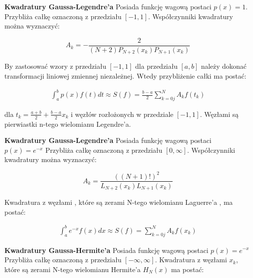 \documentclass{article}
\begin{document}
\textbf{Kwadratury Gaussa-Legendre’a}
\newline
Posiada funkcję wagową postaci $p(x) = 1.$
Przybliża całkę oznaczoną z przedziału $[-1, 1]$. Współczynniki kwadratury można
wyznaczyć:

\begin{equation}
    A_k=-\frac{2}{(N+2)P_{N+2}(x_k)P_{N+1}(x_k)}
\end{equation}

By zastosować wzory z przedziału $[-1, 1]$ dla przedziału $[a, b]$ należy dokonać
transformacji liniowej zmiennej niezależnej. Wtedy przybliżenie całki ma postać:
 
 \begin{equation}
\begin{array}{c}
\displaystyle \int_{a}^{b} p(x)f(t)dt \approx S(f) = \frac{b-a}{2} \displaystyle \sum_{k=0 j}^N A_kf(t_k)
\end{array}
\end{equation}

dla $t_k=\frac{a+b}{2}+\frac{b-a}{2}x_k$ i węzłów rozłożonych w przedziale $[-1, 1]$. Węzłami są
pierwiastki n-tego wielomianu Legendre'a.

\vspace{5}
\setlength{\parindent}{0pt}
\textbf{Kwadratury Gaussa-Legendre’a}
\newline
Posiada funkcję wagową postaci $p(x) = e^{-x}$
Przybliża całkę oznaczoną z przedziału $[0, \infty]$. Współczynniki kwadratury można
wyznaczyć:

\begin{equation}
    A_k=\frac{((N+1)!)^2}{L_{N+2}(x_k)L_{N+1}(x_k)}
\end{equation}

Kwadratura z węzłami , które są zerami N-tego wielomianu Laguerre'a , ma postać:
 
 \begin{equation}
\begin{array}{c}
\displaystyle \int_{a}^{b} e^{-x}f(x)dx \approx S(f) = \displaystyle \sum_{k=0 j}^N A_kf(x_k)
\end{array}
\end{equation}


\setlength{\parindent}{-5pt}
\textbf{ Kwadratury Gaussa-Hermite’a}
\newline
Posiada funkcję wagową postaci $p(x) = e^{-x}$
Przybliża całkę oznaczoną z przedziału $[-\infty, \infty]$. Kwadratura z węzłami $x_k$, które są
zerami N-tego wielomianu Hermite'a $H_N(x)$ ma postać:
 
\end{document}
